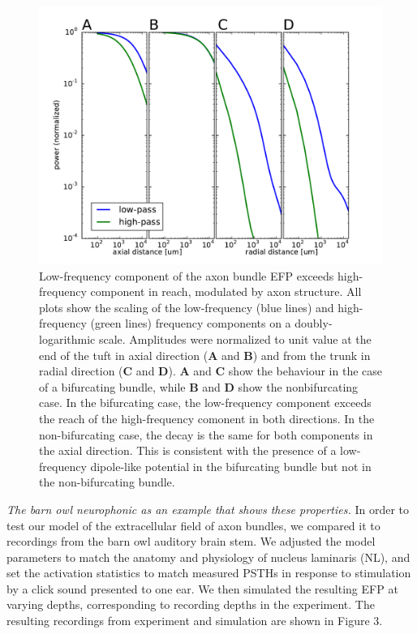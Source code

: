 \documentclass[]{article}
\begin{document}
\begin{figure}[htbp]
\centering
\includegraphics{../figs/fig_2.pdf}
\caption{Low-frequency component of the axon bundle EFP exceeds
high-frequency component in reach, modulated by axon structure. All
plots show the scaling of the low-frequency (blue lines) and
high-frequency (green lines) frequency components on a
doubly-logarithmic scale. Amplitudes were normalized to unit value at
the end of the tuft in axial direction (\textbf{A} and \textbf{B}) and
from the trunk in radial direction (\textbf{C} and \textbf{D}).
\textbf{A} and \textbf{C} show the behaviour in the case of a
bifurcating bundle, while \textbf{B} and \textbf{D} show the
nonbifurcating case. In the bifurcating case, the low-frequency
component exceeds the reach of the high-frequency comonent in both
directions. In the non-bifurcating case, the decay is the same for both
components in the axial direction. This is consistent with the presence
of a low-frequency dipole-like potential in the bifurcating bundle but
not in the non-bifurcating bundle.}
\end{figure}

\emph{The barn owl neurophonic as an example that shows these
properties.} In order to test our model of the extracellular field of
axon bundles, we compared it to recordings from the barn owl auditory
brain stem. We adjusted the model parameters to match the anatomy and
physiology of nucleus laminaris (NL), and set the activation statistics
to match measured PSTHs in response to stimulation by a click sound
presented to one ear. We then simulated the resulting EFP at varying
depths, corresponding to recording depths in the experiment. The
resulting recordings from experiment and simulation are shown in Figure
3.
\end{document}
